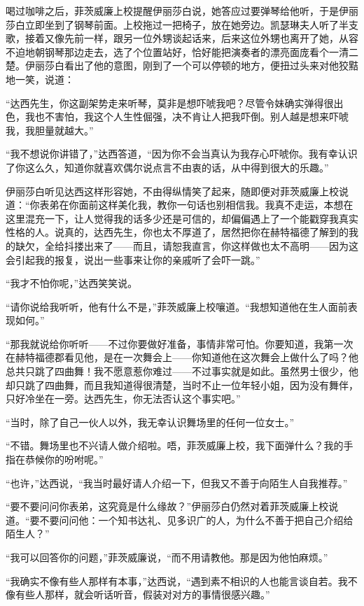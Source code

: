 \par 喝过咖啡之后，菲茨威廉上校提醒伊丽莎白说，她答应过要弹琴给他听，于是伊丽莎白立即坐到了钢琴前面。上校拖过一把椅子，放在她旁边。凯瑟琳夫人听了半支歌，接着又像先前一样，跟另一位外甥谈起话来，后来这位外甥也离开了她，从容不迫地朝钢琴那边走去，选了个位置站好，恰好能把演奏者的漂亮面庞看个一清二楚。伊丽莎白看出了他的意图，刚到了一个可以停顿的地方，便扭过头来对他狡黠地一笑，说道：
\par “达西先生，你这副架势走来听琴，莫非是想吓唬我吧？尽管令妹确实弹得很出色，我也不害怕，我这个人生性倔强，决不肯让人把我吓倒。别人越是想来吓唬我，我胆量就越大。”
\par “我不想说你讲错了，”达西答道，“因为你不会当真认为我存心吓唬你。我有幸认识了你这么久，知道你就喜欢偶尔说点言不由衷的话，从中得到很大的乐趣。”
\par 伊丽莎白听见达西这样形容她，不由得纵情笑了起来，随即便对菲茨威廉上校说道：“你表弟在你面前这样美化我，教你一句话也别相信我。我真不走运，本想在这里混充一下，让人觉得我的话多少还是可信的，却偏偏遇上了一个能戳穿我真实性格的人。说真的，达西先生，你也太不厚道了，居然把你在赫特福德了解到的我的缺欠，全给抖搂出来了——而且，请恕我直言，你这样做也太不高明——因为这会引起我的报复，说出一些事来让你的亲戚听了会吓一跳。”
\par “我才不怕你呢，”达西笑笑说。
\par “请你说给我听听，他有什么不是，”菲茨威廉上校嚷道。“我想知道他在生人面前表现如何。”
\par “那我就说给你听听——不过你要做好准备，事情非常可怕。你要知道，我第一次在赫特福德郡看见他，是在一次舞会上——你知道他在这次舞会上做什么了吗？他总共只跳了四曲舞！我不愿意惹你难过——不过事实就是如此。虽然男士很少，他却只跳了四曲舞，而且我知道得很清楚，当时不止一位年轻小姐，因为没有舞伴，只好冷坐在一旁。达西先生，你无法否认这个事实吧。”
\par “当时，除了自己一伙人以外，我无幸认识舞场里的任何一位女士。”
\par “不错。舞场里也不兴请人做介绍啦。唔，菲茨威廉上校，我下面弹什么？我的手指在恭候你的吩咐呢。”
\par “也许，”达西说，“我当时最好请人介绍一下，但我又不善于向陌生人自我推荐。”
\par “要不要问问你表弟，这究竟是什么缘故？”伊丽莎白仍然对着菲茨威廉上校说道。“要不要问问他：一个知书达礼、见多识广的人，为什么不善于把自己介绍给陌生人？”
\par “我可以回答你的问题，”菲茨威廉说，“而不用请教他。那是因为他怕麻烦。”
\par “我确实不像有些人那样有本事，”达西说，“遇到素不相识的人也能言谈自若。我不像有些人那样，就会听话听音，假装对对方的事情很感兴趣。”
